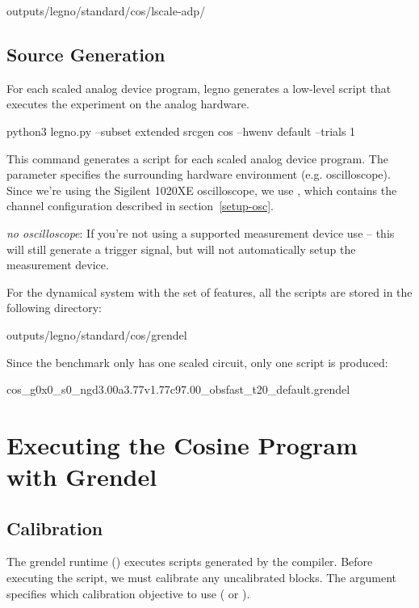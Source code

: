 \begin{snippet}
  outputs/legno/standard/cos/lscale-adp/
\end{snippet}

\subsection{Source Generation}

For each scaled analog device program, legno generates a low-level \grendel
script that executes the experiment on the analog hardware. 

\begin{snippet}
  python3 legno.py --subset extended srcgen cos --hwenv default --trials 1
\end{snippet}

This command generates a \grendel script for each scaled analog device program.
The  parameter specifies the surrounding hardware environment
(e.g. oscilloscope). Since we're using the Sigilent 1020XE oscilloscope, we use
, which contains the channel configuration described in section~\ref{setup-osc}.

\noindent\textit{no oscilloscope}: If you're not using a supported measurement device use
 -- this will still generate a trigger signal, but will not
automatically setup the measurement device.

For the  dynamical system with the  set of features, all
the \grendel scripts are stored in the following directory:

\begin{snippet}
  outputs/legno/standard/cos/grendel
\end{snippet}

Since the  benchmark only has one scaled circuit, only one \grendel
script is produced:

\begin{snippet}
  cos_g0x0_s0_ngd3.00a3.77v1.77c97.00_obsfast_t20_default.grendel
\end{snippet}

\section{Executing the Cosine Program with Grendel}

\subsection{Calibration}
The grendel runtime () executes  scripts generated
by the \legno compiler. Before executing the script, we must calibrate any
uncalibrated blocks. The  argument specifies which calibration
objective to use ( or ).

